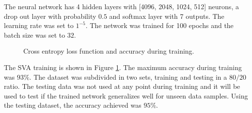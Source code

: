 \documentclass[]{spie}  %
\begin{document}
The neural network has 4 hidden layers with [4096, 2048, 1024, 512] neurons, a drop out layer with probability $0.5$ and 
softmax layer with 7 outputs. The learning rate was set to $1^{-5}$. The network was trained for 100 epochs and the batch size was set to $32$.
\begin{figure}[h]
\centering 
    \caption{Cross entropy loss function and accuracy during training.}
    \label{fig:learning}
\end{figure}
The SVA training is shown in Figure \ref{fig:learning}.
The maximum accuracy during training was $93\%$. 
The dataset was subdivided in two sets, training and testing in a $80/20$ ratio. 
The testing data was not used at any point during training and it 
will be used to test if the trained network generalizes well for unseen data samples. 
Using the testing dataset, the accuracy achieved was $95\%$. 

\end{document}
